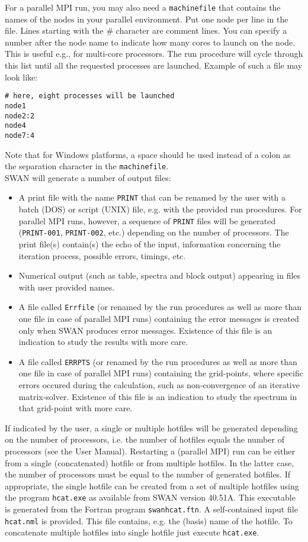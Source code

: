 \documentclass[12pt]{book}
\begin{document}
\noindent
For a parallel MPI run, you may also need a {\tt machinefile} that contains the names of the
nodes in your parallel environment. Put one node per line in the file. Lines starting with
the \# character are comment lines. You can specify a number after the node name to indicate
how many cores to launch on the node. This is useful e.g., for multi-core processors. The run
procedure will cycle through this list until all the requested processes are launched. Example
of such a file may look like:
\begin{verbatim}
# here, eight processes will be launched
node1
node2:2
node4
node7:4
\end{verbatim}
Note that for Windows platforms, a space should be used instead of a colon as the separation
character in the {\tt machinefile}.
\\[2ex]
\noindent
SWAN will generate a number of output files:
\begin{itemize}
   \item A print file with the name {\tt PRINT} that can be renamed by the user with a batch (DOS) or
         script (UNIX) file, e.g. with the provided run procedures. For parallel MPI runs, however,
         a sequence of {\tt PRINT} files will be generated ({\tt PRINT-001}, {\tt PRINT-002}, etc.)
         depending on the number of processors. The print file(s) contain(s) the echo of the input,
         information concerning the iteration process, possible errors, timings, etc.
   \item Numerical output (such as table, spectra and block output) appearing in files with user
         provided names.
   \item A file called {\tt Errfile} (or renamed by the run procedures as well as more than one file in
         case of parallel MPI runs) containing the error messages is created only when SWAN produces
         error messages. Existence of this file is an indication to study the results with more care.
   \item A file called {\tt ERRPTS} (or renamed by the run procedures as well as more than one file in
         case of parallel MPI runs) containing the grid-points, where specific errors occured during
         the calculation, such as non-convergence of an iterative matrix-solver. Existence of this file
         is an indication to study the spectrum in that grid-point with more care.
\end{itemize}
If indicated by the user, a single or multiple hotfiles will be generated depending on the number of
processors, i.e. the number of hotfiles equals the number of processors (see the User Manual). Restarting
a (parallel MPI) run can be either from a single (concatenated) hotfile or from multiple hotfiles.
In the latter case, the number of processors must be equal to the number of generated hotfiles. If
appropriate, the single hotfile can be created from a set of multiple hotfiles using the program
{\tt hcat.exe} as available from SWAN version 40.51A. This executable is generated from the Fortran
program {\tt swanhcat.ftn}. A self-contained input file {\tt hcat.nml} is provided. This file contains,
e.g. the (basis) name of the hotfile. To concatenate multiple hotfiles into single hotfile just execute
{\tt hcat.exe}.
\end{document}
